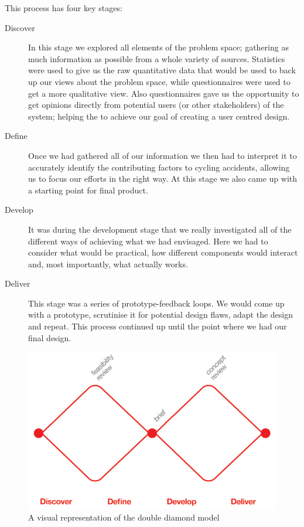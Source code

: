 \documentclass[a4paper]{report}
\begin{document}
This process has four key stages:
\begin{description}
\item[Discover] In this stage we explored all elements of the problem space; gathering as much information as possible from a whole variety of sources. Statistics were used to give us the raw quantitative data that would be used to back up our views about the problem space, while questionnaires were used to get a more qualitative view. Also questionnaires gave us the opportunity to get opinions directly from potential users (or other stakeholders) of the system; helping the to achieve our goal of creating a user centred design.
\item[Define] Once we had gathered all of our information we then had to interpret it to accurately identify the contributing factors to cycling accidents, allowing us to focus our efforts in the right way. At this stage we also came up with a starting point for final product.
\item[Develop] It was during the development stage that we really investigated all of the different ways of achieving what we had envisaged. Here we had to consider what would be practical, how different components would interact and, most importantly, what actually works.
\item[Deliver] This stage was a series of prototype-feedback loops. We would come up with a prototype, scrutinise it for potential design flaws, adapt the design and repeat. This process continued up until the point where we had our final design.
\end{description}

\begin{figure}[t]
\centering
\includegraphics[scale=0.6]{figures/diamond}
\caption{A visual representation of the double diamond model}
\label{fig:diamond}


\end{figure}
\end{document}
